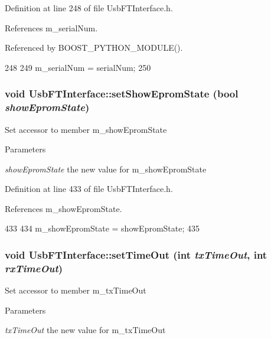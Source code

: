 Definition at line 248 of file UsbFTInterface.h.

References m\_\-serialNum.

Referenced by BOOST\_\-PYTHON\_\-MODULE().


\begin{DoxyCode}
248                                           {
249     m_serialNum = serialNum;
250   }
\end{DoxyCode}
\hypertarget{classUsbFTInterface_aff0c9289dfd34e05e472f2f115f78a01}{
\subsubsection[{setShowEpromState}]{\setlength{\rightskip}{0pt plus 5cm}void UsbFTInterface::setShowEpromState (bool {\em showEpromState})}}
\label{classUsbFTInterface_aff0c9289dfd34e05e472f2f115f78a01}
Set accessor to member m\_\-showEpromState 
\begin{DoxyParams}{Parameters}
\item[{\em showEpromState}]the new value for m\_\-showEpromState \end{DoxyParams}


Definition at line 433 of file UsbFTInterface.h.

References m\_\-showEpromState.


\begin{DoxyCode}
433                                                {
434     m_showEpromState = showEpromState;
435   }
\end{DoxyCode}
\hypertarget{classUsbFTInterface_a62d90f80a81d1decd66f9b9f10cb8dc6}{
\subsubsection[{setTimeOut}]{\setlength{\rightskip}{0pt plus 5cm}void UsbFTInterface::setTimeOut (int {\em txTimeOut}, \/  int {\em rxTimeOut})}}
\label{classUsbFTInterface_a62d90f80a81d1decd66f9b9f10cb8dc6}
Set accessor to member m\_\-txTimeOut 
\begin{DoxyParams}{Parameters}
\item[{\em txTimeOut}]the new value for m\_\-txTimeOut \end{DoxyParams}



